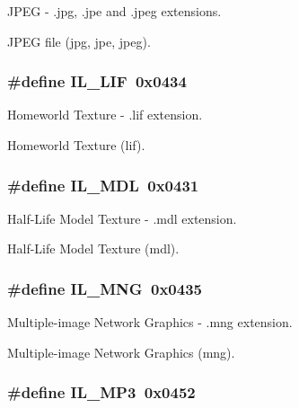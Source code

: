 J\+P\+E\+G -\/ .jpg, .jpe and .jpeg extensions. 

J\+P\+E\+G file (jpg, jpe, jpeg). \hypertarget{group__il__formats_ga046e1a13b4099c0e53ead2423612aa5b}{
\subsubsection[{I\+L\+\_\+\+L\+I\+F}]{\setlength{\rightskip}{0pt plus 5cm}\#define I\+L\+\_\+\+L\+I\+F~0x0434}}\label{group__il__formats_ga046e1a13b4099c0e53ead2423612aa5b}


Homeworld Texture -\/ .lif extension. 

Homeworld Texture (lif). \hypertarget{group__il__formats_ga77ffd8f2fe9aada605897068f3ac8ad1}{
\subsubsection[{I\+L\+\_\+\+M\+D\+L}]{\setlength{\rightskip}{0pt plus 5cm}\#define I\+L\+\_\+\+M\+D\+L~0x0431}}\label{group__il__formats_ga77ffd8f2fe9aada605897068f3ac8ad1}


Half-\/\+Life Model Texture -\/ .mdl extension. 

Half-\/\+Life Model Texture (mdl). \hypertarget{group__il__formats_gaa1c28f0b33674565bd4a9291ac0488d4}{
\subsubsection[{I\+L\+\_\+\+M\+N\+G}]{\setlength{\rightskip}{0pt plus 5cm}\#define I\+L\+\_\+\+M\+N\+G~0x0435}}\label{group__il__formats_gaa1c28f0b33674565bd4a9291ac0488d4}


Multiple-\/image Network Graphics -\/ .mng extension. 

Multiple-\/image Network Graphics (mng). \hypertarget{group__il__formats_ga79d0df78986bbc3e2a8317cc22d2d0ed}{
\subsubsection[{I\+L\+\_\+\+M\+P3}]{\setlength{\rightskip}{0pt plus 5cm}\#define I\+L\+\_\+\+M\+P3~0x0452}}\label{group__il__formats_ga79d0df78986bbc3e2a8317cc22d2d0ed}


